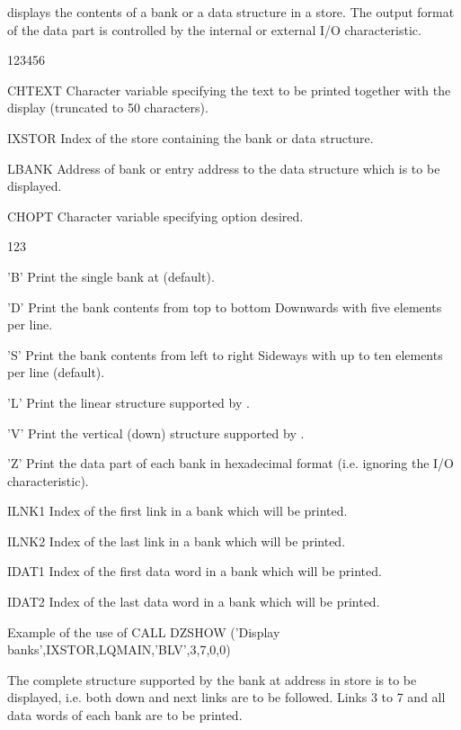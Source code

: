 \Action
{} displays the contents of a bank or a data structure in a
store. The output format of the data part is controlled by the internal
or external I/O characteristic.
\begin{DLtt}{123456}
\item[CHTEXT]Character variable specifying the text to be printed
together with the display (truncated to 50 characters).
\item[IXSTOR]Index of the store containing the bank or data structure.
\item[LBANK]Address of bank or entry address to the data structure
which is to be displayed.
\item[CHOPT]Character variable specifying option desired.
\begin{DLtt}{123}
\item['B']Print the single bank at  (default).
\item['D']Print the bank contents from top to bottom Downwards
with five elements per line.
\item['S']Print the bank contents from left to right Sideways
with up to ten elements per line (default).
\item['L']Print the linear structure supported by .
\item['V']Print the vertical (down) structure supported by .
\item['Z']Print the data part of each bank in hexadecimal format
(i.e. ignoring the I/O characteristic).
\end{DLtt}
\item[ILNK1]Index of the first link in a bank which will be printed.
\item[ILNK2]Index of the last link in a bank which will be printed.
\item[IDAT1]Index of the first data word in a bank which will be printed.
\item[IDAT2]Index of the last data word in a bank which will be printed.
\end{DLtt}
\begin{XMPt}{Example of the use of }
      CALL DZSHOW ('Display banks',IXSTOR,LQMAIN,'BLV',3,7,0,0)
\end{XMPt}
The complete 
structure supported by the bank
at address  in  store  is to
be displayed, i.e. both down and next links are to be followed.
Links 3 to 7 and all data words of each bank are to be printed.
